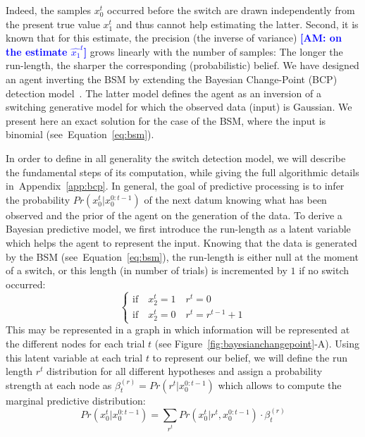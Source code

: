 \documentclass[12pt,english]{article}%
\newcommand{\choice}[1]{ %
	\left\{ %
		\begin{array}{l} #1 \end{array} %
	\right. }
\newcommand{\eql}[1]{\begin{equation}#1\end{equation}}
\newcommand{\citep}[1]{\parencite{#1}}
\newcommand{\seeFig}[1]{Figure~\ref{fig:#1}}
\newcommand{\seeEq}[1]{Equation~\ref{eq:#1}}
\newcommand{\seeApp}[1]{Appendix~\ref{app:#1}}
\newcommand{\AM}[1]{\textbf{\textcolor{blue}{[AM: #1]}}}
\begin{document}
Indeed, the samples $x_0^t$ occurred before the switch are drawn independently from the present true value $x_1^t$
and thus cannot help estimating the latter.
Second, it is known that for this estimate, the precision
(the inverse of variance) \AM{on the estimate $\hat{x_1}^{t}$}
grows linearly with the number of samples:
The longer the run-length, the sharper the corresponding (probabilistic) belief.
We have designed an agent inverting the BSM by extending
the Bayesian Change-Point (BCP) detection model~\citep{AdamsMackay2007}.
The latter model defines the agent as an inversion of a switching generative model
for which the observed data (input) is Gaussian.
We present here an exact solution for the case of the BSM, where the input is binomial (see~\seeEq{bsm}).

In order to define in all generality the switch detection model,
we will describe the fundamental steps of its computation,
while giving the full algorithmic details in~\seeApp{bcp}.
In general, the goal of predictive processing
is to infer the probability $Pr(x_0^t | x_0^{0:t-1})$ of the next datum
knowing what has been observed and
the prior of the agent on the generation of the data.
To derive a Bayesian predictive model, we first introduce
the run-length as a latent variable which helps the agent to represent the input.
Knowing that the data is generated by the BSM (see~\seeEq{bsm}),
the run-length is either null at the moment of a switch,
or this length (in number of trials) is incremented by $1$ if no switch occurred:
\eql{\choice{
\text{if} \quad x_2^t=1 \quad r^t = 0\\
\text{if} \quad x_2^t=0 \quad r^t = r^{t-1} +1 }\label{eq:run_length}}%
This may be represented in a graph
in which information will be represented at the different nodes for each trial $t$ (see \seeFig{bayesianchangepoint}-A).
Using this latent variable at each trial $t$ to represent our belief,
we will define the run length $r^t$ distribution
for all different hypotheses
and assign a probability strength at each node
as $\beta^{(r)}_t=Pr(r^t | x_0^{0:t-1})$
which allows to compute the marginal predictive distribution:
\eql{
Pr(x_0^t | x_0^{0:t-1}) = \sum_{r^{t}} Pr(x_0^t | r^{t}, x_0^{0:t-1}) \cdot  \beta^{(r)}_t
\label{eq:pred}
}
\end{document}
